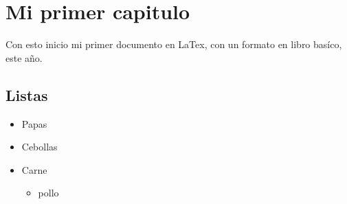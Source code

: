 \documentclass[11pt]{book}
\begin{document}
\chapter*{Mi primer capitulo}

Con esto inicio mi primer documento en LaTex, con un formato en libro basíco, este año.

\section*{Listas}

\begin{itemize}
	\item Papas
	\item Cebollas
	\item Carne
	\begin{itemize}
		\item pollo
	\end{itemize}
\end{itemize}
\end{document}
